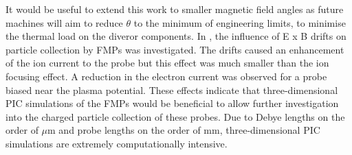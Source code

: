 It would be useful to extend this work to smaller magnetic field angles as future machines will aim to reduce $\theta$ to the minimum of engineering limits, to minimise the thermal load on the diveror components. In \cite{Bergmann-2002}, the influence of E x B drifts on particle collection by FMPs was investigated. The drifts caused an enhancement of the ion current to the probe but this effect was much smaller than the ion focusing effect. A reduction in the electron current was observed for a probe biased near the plasma potential. These effects indicate that  three-dimensional PIC simulations of the FMPs would be beneficial to allow further investigation into the charged particle collection of these probes. Due to Debye lengths on the order of $\mu$m and probe lengths on the order of mm, three-dimensional PIC simulations are extremely computationally intensive.








